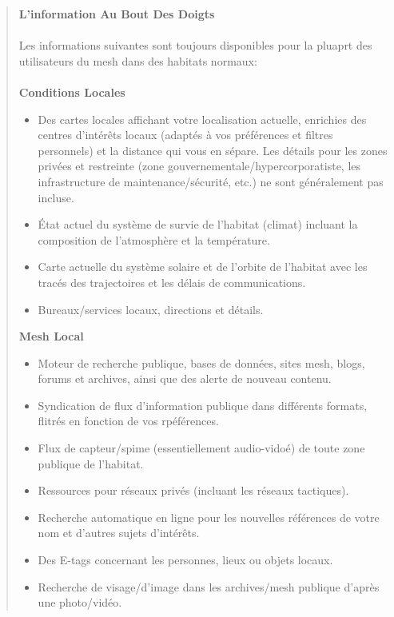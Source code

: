 \begin{quotation} \textbf{L'information Au Bout Des Doigts} \\ \\ Les informations suivantes sont toujours disponibles pour la pluaprt des utilisateurs du mesh dans des habitats normaux: \\ \\ \noindent \textbf{Conditions Locales} \begin{itemize} \item Des cartes locales affichant votre localisation actuelle, enrichies des centres d'intérêts locaux (adaptés à vos préférences et filtres personnels) et la distance qui vous en sépare. Les détails pour les zones privées et restreinte (zone gouvernementale/hypercorporatiste, les infrastructure de maintenance/sécurité, etc.) ne sont généralement pas incluse. \item État actuel du système de survie de l'habitat (climat) incluant la composition de l'atmosphère et la température. \item Carte actuelle du système solaire et de l'orbite de l'habitat avec les tracés des trajectoires et les délais de communications. \item Bureaux/services locaux, directions et détails. \end{itemize} 

\noindent \textbf{Mesh Local} \begin{itemize} \item Moteur de recherche publique, bases de données, sites mesh, blogs, forums et archives, ainsi que des alerte de nouveau contenu. \item Syndication de flux d'information publique dans différents formats, flitrés en fonction de vos rpéférences. \item Flux de capteur/spime (essentiellement audio-vidoé) de toute zone publique de l'habitat. \item Ressources pour réseaux privés (incluant les réseaux tactiques). \item Recherche automatique en ligne pour les nouvelles références de votre nom et d'autres sujets d'intérêts. \item Des E-tags concernant les personnes, lieux ou objets locaux. \item Recherche de visage/d'image dans les archives/mesh publique d'après une photo/vidéo. \end{itemize} 


\end{quotation}
